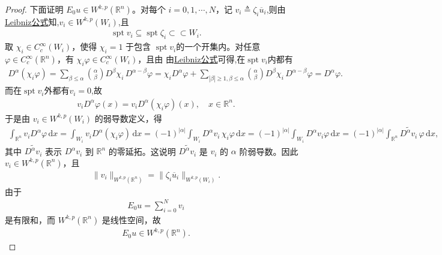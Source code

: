 \documentclass[../../main.tex]{subfiles}
\begin{document}
\begin{proof}
下面证明 $E_0u\in W^{k,p}(\mathbb{R}^n)$。对每个 $i=0,1,\cdots,N$，记
$v_i\triangleq\zeta_i\overline{u}_i$,则由\hyperref[theorem:ch05-弱导数性质]{Leibniz公式}知,$v_i\in W^{k,p}(W_i)$,且
\begin{align*}
\operatorname{spt}v_i\subseteq\operatorname{spt}\zeta_i\subset\subset W_i.
\end{align*}
取 $\chi_i\in C_c^\infty(W_i)$，使得 $\chi_i=1$ 于包含 $\operatorname{spt}v_i$的一个开集内。对任意 $\varphi\in C_c^\infty(\mathbb{R}^n)$，有 $\chi_i\varphi\in C_c^\infty(W_i)$，且由 由\hyperref[theorem:ch05-弱导数性质]{Leibniz公式}可得,在$\operatorname{spt}v_i$内都有
\begin{align*}
D^{\alpha}(\chi _i\varphi )=\sum_{\beta \leqslant \alpha}{\binom{\alpha}{\beta}D^{\beta}\chi _i\,D^{\alpha -\beta}\varphi}=\chi _iD^{\alpha}\varphi +\sum_{|\beta |\geqslant 1,\beta \leqslant \alpha}{\binom{\alpha}{\beta}D^{\beta}\chi _i\,D^{\alpha -\beta}\varphi}=D^{\alpha}\varphi .
\end{align*}
而在$\operatorname{spt}v_i$外都有$v_i=0$,故
\begin{align*}
v_iD^\alpha\varphi(x)=v_iD^\alpha(\chi_i\varphi)(x),\quad x\in \mathbb{R}^n.
\end{align*}
于是由 $v_i\in W^{k,p}(W_i)$ 的弱导数定义，得
\begin{align*}
\int_{\mathbb{R}^n}v_iD^\alpha\varphi\,\mathrm{d}x
=\int_{W_i}v_iD^\alpha(\chi_i\varphi)\,\mathrm{d}x=(-1)^{|\alpha|}\int_{W_i}D^\alpha v_i\,\chi_i\varphi\,\mathrm{d}x=(-1)^{|\alpha|}\int_{W_i}D^\alpha v_i\varphi\,\mathrm{d}x=(-1)^{|\alpha|}\int_{\mathbb{R}^n}\widetilde{D^\alpha v_i}\,\varphi\,\mathrm{d}x,
\end{align*}
其中 $\widetilde{D^\alpha v_i}$ 表示 $D^\alpha v_i$ 到 $\mathbb{R}^n$ 的零延拓。这说明 $\widetilde{D^\alpha v_i}$ 是 $v_i$ 的 $\alpha$ 阶弱导数。因此 $v_i\in W^{k,p}(\mathbb{R}^n)$，且
\begin{align*}
\|v_i\|_{W^{k,p}(\mathbb{R}^n)}=\|\zeta_i\overline{u}_i\|_{W^{k,p}(W_i)}.
\end{align*}
由于
\begin{align*}
E_0u=\sum\limits_{i=0}^{N}v_i
\end{align*}
是有限和，而 $W^{k,p}(\mathbb{R}^n)$ 是线性空间，故
\begin{align*}
E_0u\in W^{k,p}(\mathbb{R}^n).
\end{align*}


\end{proof}
\end{document}
